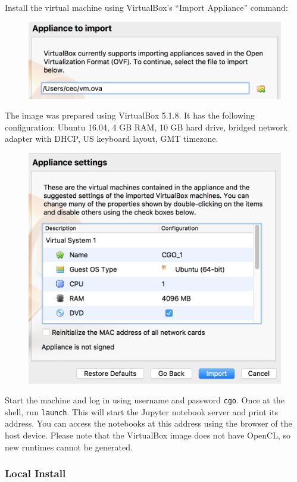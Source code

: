 \noindent
Install the virtual machine using VirtualBox's ``Import Appliance'' command:
\begin{figure}[H]
  \includegraphics[width=\columnwidth]{img/vm1}
\end{figure}
\noindent
The image was prepared using VirtualBox 5.1.8. It has the following configuration: Ubuntu 16.04, 4 GB RAM, 10 GB hard drive, bridged network adapter with DHCP, US keyboard layout, GMT timezone.
\begin{figure}[H]
  \includegraphics[width=\columnwidth]{img/vm2}
\end{figure}
\noindent
Start the machine and log in using username and password \texttt{cgo}. Once at the shell, run \texttt{launch}. This will start the Jupyter notebook server and print its address. You can access the notebooks at this address using the browser of the host device. Please note that the VirtualBox image does not have OpenCL, so new runtimes cannot be generated.

\subsubsection{Local Install}

